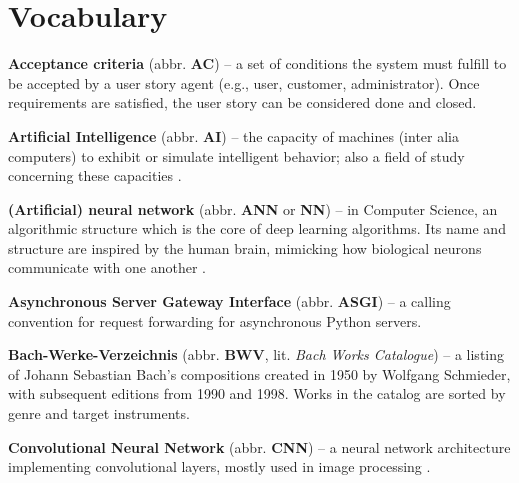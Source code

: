 \documentclass[a4paper, 11pt, twoside]{report}
\theoremstyle{definition}
\begin{document}
\newpage



{}

\nocite{*}
\printbibliography

\newpage



\chapter*{Vocabulary}
\label{sec:vocab}

\vskip5pt \noindent
\textbf{Acceptance criteria} (abbr. \textbf{AC}) -- a set of conditions the system must fulfill to be accepted by a user story agent (e.g., user, customer, administrator). Once requirements are satisfied, the user story can be considered done and closed.

\vskip5pt \noindent
\textbf{Artificial Intelligence} (abbr. \textbf{AI}) -- the capacity of machines (inter alia computers) to exhibit or simulate intelligent behavior; also a field of study concerning these capacities \cite{AI_OED}.

\vskip5pt \noindent
\textbf{(Artificial) neural network} (abbr. \textbf{ANN} or \textbf{NN}) -- in Computer Science, an algorithmic structure which is the core of deep learning algorithms. Its name and structure are inspired by the human brain, mimicking how biological neurons communicate with one another \cite{NN_IBM}.

\vskip5pt \noindent
\textbf{Asynchronous Server Gateway Interface} (abbr. \textbf{ASGI}) -- a calling convention for request forwarding for asynchronous Python servers.

\vskip5pt \noindent
\textbf{Bach-Werke-Verzeichnis} (abbr. \textbf{BWV}, lit. \textit{Bach Works Catalogue}) -- a listing of Johann Sebastian Bach's compositions created in 1950 by Wolfgang Schmieder, with subsequent editions from 1990 and 1998. Works in the catalog are sorted by genre and target instruments.

\vskip5pt \noindent
\textbf{Convolutional Neural Network} (abbr. \textbf{CNN}) -- a neural network architecture implementing convolutional layers, mostly used in image processing \cite{CNN}.
\end{document}

